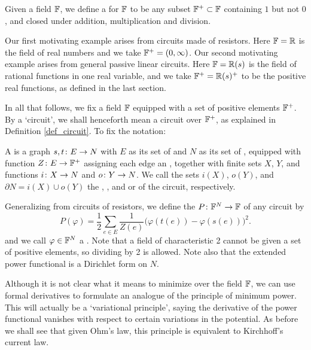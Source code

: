 \begin{definition} 
  Given a field ${\mathbb F}$, we define a  for ${\mathbb F}$ to be     
  any subset ${\mathbb F}^+\subset {\mathbb F}$ containing $1$ but not $0$, and closed under 
  addition, multiplication and division.  
\end{definition}

Our first motivating example arises from circuits made of resistors.  Here ${\mathbb F} =
{\mathbb{R}}$ is the field of real numbers and we take ${\mathbb F}^+ = (0,\infty)$.   Our second
motivating example arises from general passive linear circuits.  Here ${\mathbb F} =
{\mathbb{R}}(s)$ is the field of rational functions in one real variable, and we take
${\mathbb F}^+ = {\mathbb{R}}(s)^+$ to be the positive real functions, as defined in the last
section.  

In all that follows, we fix a field ${\mathbb F}$ equipped with a set of positive
elements ${\mathbb F}^+$.  By a `circuit', we shall henceforth mean a circuit over
${\mathbb F}^+$, as explained in Definition \ref{def_circuit}.   To fix the notation:

\begin{definition} \label{def_circuit_2}
A  is a graph $s,t {\colon} E \to N$ with $E$ as its set of  and $N$ as its set of , equipped with function $Z {\colon} E \to {\mathbb F}^+$ assigning each edge an , together with finite sets $X$, $Y$, and functions $i {\colon} X \to N$ and $o{\colon} Y \to  N$. We call the sets $i(X)$, $o(Y)$, and $\partial N = i(X) \cup o(Y)$ the , , and  or  of the circuit, respectively.
\end{definition}

Generalizing from circuits of resistors, we define the
 $P{\colon} {\mathbb F}^N \to {\mathbb F}$ of any circuit by
\[
  P(\varphi) = \frac{1}{2} \sum_{e \in E} \frac1{Z(e)}\big(\varphi(t(e))-\varphi(s(e))\big)^2.
\]
and we call $\varphi \in {\mathbb F}^N$ a .  Note that a field of
characteristic 2 cannot be given a set of positive elements, so dividing by 2 is
allowed.  Note also that the extended power functional is a Dirichlet form on
$N$.

Although it is not clear what it means to minimize over the field ${\mathbb F}$, we can
use formal derivatives to formulate an analogue of the principle of minimum 
power.   This will actually be a `variational principle', saying the derivative of
the power functional vanishes with respect to certain variations in the potential.
As before we shall see that given Ohm's law, this principle is equivalent to
Kirchhoff's current law.

